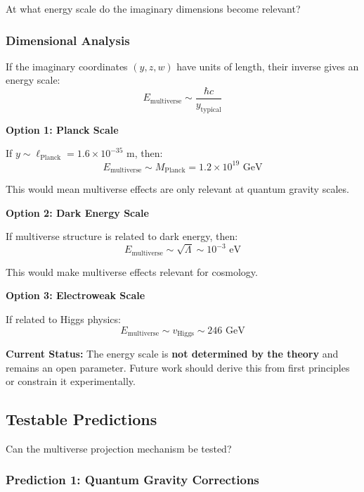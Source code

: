 At what energy scale do the imaginary dimensions become relevant?

\subsubsection{Dimensional Analysis}

If the imaginary coordinates $(y, z, w)$ have units of length, their inverse gives an energy scale:
\begin{equation}
E_{\text{multiverse}} \sim \frac{\hbar c}{y_{\text{typical}}}
\end{equation}

\textbf{Option 1: Planck Scale}

If $y \sim \ell_{\text{Planck}} = 1.6 \times 10^{-35}$ m, then:
\begin{equation}
E_{\text{multiverse}} \sim M_{\text{Planck}} = 1.2 \times 10^{19} \text{ GeV}
\end{equation}

This would mean multiverse effects are only relevant at quantum gravity scales.

\textbf{Option 2: Dark Energy Scale}

If multiverse structure is related to dark energy, then:
\begin{equation}
E_{\text{multiverse}} \sim \sqrt{\Lambda} \sim 10^{-3} \text{ eV}
\end{equation}

This would make multiverse effects relevant for cosmology.

\textbf{Option 3: Electroweak Scale}

If related to Higgs physics:
\begin{equation}
E_{\text{multiverse}} \sim v_{\text{Higgs}} \sim 246 \text{ GeV}
\end{equation}

\textbf{Current Status:} The energy scale is \textbf{not determined by the theory} and remains an open parameter. Future work should derive this from first principles or constrain it experimentally.

\subsection{Testable Predictions}

Can the multiverse projection mechanism be tested?

\subsubsection{Prediction 1: Quantum Gravity Corrections}

